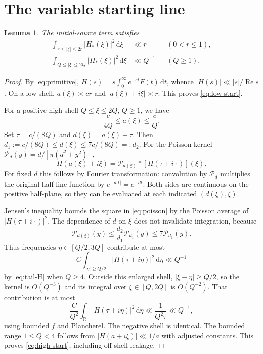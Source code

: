 \documentclass[11pt,letterpaper]{article}
\numberwithin{equation}{section}
\newtheorem{lemma}[theorem]{Lemma}
\theoremstyle{definition}
\theoremstyle{remark}
\newcommand{\R}{\mathbb R}
\newcommand{\dd}{\,\mathrm d}
\newcommand{\Rea}{\operatorname{Re}}
\begin{document}
\section{The variable starting line}\label{sec:start}

\begin{lemma}\label{lem:start}
The initial-source term satisfies
\begin{align}
 \int_{r\le|\xi|\le2r}|H_*(\xi)|^2\dd\xi&\ll r&& (0<r\le1),
 \label{eq:low-start}\\
 \int_{Q\le|\xi|\le2Q}|H_*(\xi)|^2\dd\xi&\ll Q^{-1}&& (Q\ge1).
 \label{eq:high-start}
\end{align}
\end{lemma}
\begin{proof}
By \eqref{eq:primitive},
$H(s)=s\int_0^\infty e^{-st}F(t)\dd t$, whence
$|H(s)|\ll|s|/\Rea s$. On a low shell, $a(\xi)\asymp cr$ and
$|a(\xi)+i\xi|\asymp r$. This proves \eqref{eq:low-start}.

For a positive high shell $Q\le\xi\le2Q$, $Q\ge1$, we have
\[
 \frac c{4Q}\le a(\xi)\le\frac cQ.
\]
Set $\tau=c/(8Q)$ and $d(\xi)=a(\xi)-\tau$. Then
$d_1:=c/(8Q)\le d(\xi)\le7c/(8Q)=:d_2$.
For the Poisson kernel $\mathcal P_d(y)=d/[\pi(d^2+y^2)]$,
\begin{equation}\label{eq:poisson}
 H(a(\xi)+i\xi)=\mathcal P_{d(\xi)}*[H(\tau+i\cdot)](\xi).
\end{equation}
For fixed $d$ this follows by Fourier transformation: convolution by
$\mathcal P_d$ multiplies the original half-line function by
$e^{-d|t|}=e^{-dt}$. Both sides are continuous on the positive half-plane,
so they can be evaluated at each indicated $(d(\xi),\xi)$.

Jensen's inequality bounds the square in \eqref{eq:poisson} by the
Poisson average of $|H(\tau+i\cdot)|^2$. The dependence of $d$ on $\xi$
does not invalidate integration, because
\begin{equation}\label{eq:poisson-ratio}
 \mathcal P_{d(\xi)}(y)\le\frac{d_2}{d_1}\mathcal P_{d_1}(y)
 \le7\mathcal P_{d_1}(y).
\end{equation}
Thus frequencies $\eta\in[Q/2,3Q]$ contribute at most
\[
 C\int_{|\eta|\ge Q/2}|H(\tau+i\eta)|^2\dd\eta\ll Q^{-1}
\]
by \eqref{eq:tail-H} when $Q\ge4$. Outside this enlarged shell,
$|\xi-\eta|\ge Q/2$, so the kernel is $O(Q^{-3})$ and its integral over
$\xi\in[Q,2Q]$ is $O(Q^{-2})$. That contribution is at most
\[
 \frac C{Q^2}\int_\R|H(\tau+i\eta)|^2\dd\eta
 \ll\frac1{Q^2\tau}\ll Q^{-1},
\]
using bounded $f$ and Plancherel. The negative shell is identical. The
bounded range $1\le Q<4$ follows from $|H(a+i\xi)|\ll1/a$ with adjusted
constants. This proves \eqref{eq:high-start}, including off-shell leakage.
\end{proof}
\end{document}
